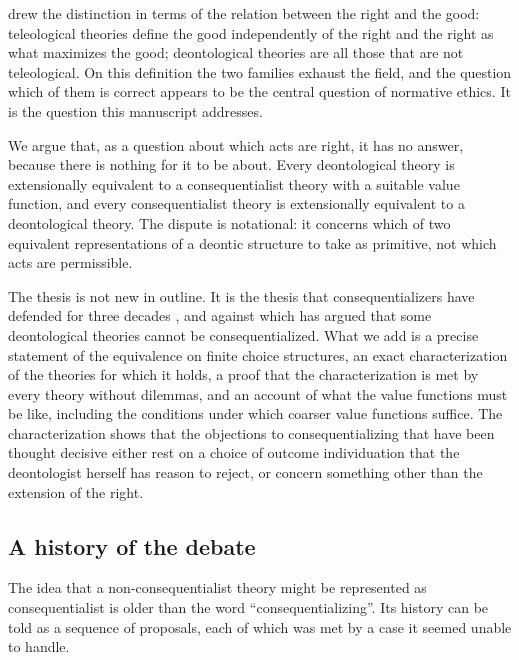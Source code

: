 \documentclass{situationist-preprint}
\begin{document}
\citet[\S 5]{Rawls1971} drew the distinction in terms of the relation between the right and the good: teleological theories define the good independently of the right and the right as what maximizes the good; deontological theories are all those that are not teleological. On this definition the two families exhaust the field, and the question which of them is correct appears to be the central question of normative ethics. It is the question this manuscript addresses.

We argue that, as a question about which acts are right, it has no answer, because there is nothing for it to be about. Every deontological theory is extensionally equivalent to a consequentialist theory with a suitable value function, and every consequentialist theory is extensionally equivalent to a deontological theory. The dispute is notational: it concerns which of two equivalent representations of a deontic structure to take as primitive, not which acts are permissible.

The thesis is not new in outline. It is the thesis that consequentializers have defended for three decades \citep{Dreier1993,Dreier2011,Portmore2007,Portmore2009}, and against which \citet{Brown2011} has argued that some deontological theories cannot be consequentialized. What we add is a precise statement of the equivalence on finite choice structures, an exact characterization of the theories for which it holds, a proof that the characterization is met by every theory without dilemmas, and an account of what the value functions must be like, including the conditions under which coarser value functions suffice. The characterization shows that the objections to consequentializing that have been thought decisive either rest on a choice of outcome individuation that the deontologist herself has reason to reject, or concern something other than the extension of the right.

\subsection{A history of the debate}

The idea that a non-consequentialist theory might be represented as consequentialist is older than the word ``consequentializing''. Its history can be told as a sequence of proposals, each of which was met by a case it seemed unable to handle.
\end{document}

